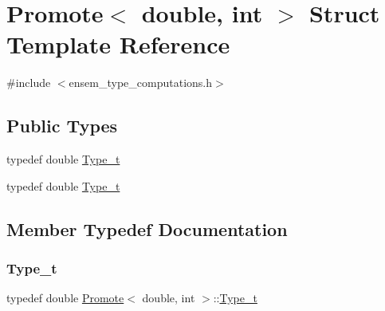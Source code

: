 \hypertarget{structPromote_3_01double_00_01int_01_4}{}\section{Promote$<$ double, int $>$ Struct Template Reference}
\label{structPromote_3_01double_00_01int_01_4}


{\ttfamily \#include $<$ensem\+\_\+type\+\_\+computations.\+h$>$}

\subsection*{Public Types}
\begin{DoxyCompactItemize}
\item 
typedef double \mbox{\hyperlink{structPromote_3_01double_00_01int_01_4_a55905f49138ff7e74738c0975fbfe652}{Type\+\_\+t}}
\item 
typedef double \mbox{\hyperlink{structPromote_3_01double_00_01int_01_4_a55905f49138ff7e74738c0975fbfe652}{Type\+\_\+t}}
\end{DoxyCompactItemize}


\subsection{Member Typedef Documentation}
\mbox{\label{structPromote_3_01double_00_01int_01_4_a55905f49138ff7e74738c0975fbfe652}} 
\subsubsection{\texorpdfstring{Type\_t}{Type\_t}\hspace{0.1cm}{\footnotesize\ttfamily [1/2]}}
{\footnotesize\ttfamily typedef double \mbox{\hyperlink{structPromote}{Promote}}$<$ double, int $>$\+::\mbox{\hyperlink{structPromote_3_01double_00_01int_01_4_a55905f49138ff7e74738c0975fbfe652}{Type\+\_\+t}}}

\mbox{\label{structPromote_3_01double_00_01int_01_4_a55905f49138ff7e74738c0975fbfe652}} 
